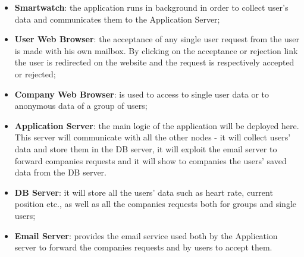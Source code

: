 \documentclass{article}
\begin{document}
\begin{itemize}
\item \textbf{Smartwatch}: the application runs in background in order to collect user's data and communicates them to the Application Server;
\item \textbf{User Web Browser}: the acceptance of any single user request from the user is made with his own mailbox. By clicking on the acceptance or rejection link the user is redirected on the website and the request is respectively accepted or rejected;
\item \textbf{Company Web Browser}: is used to access to single user data or to anonymous data of a group of users;
\item \textbf{Application Server}: the main logic of the application will be deployed here. This server will communicate with all the other nodes - it will collect users' data and store them in the DB server, it will exploit the email server to forward companies requests and it will show to companies the users' saved data from the DB server.
\item \textbf{DB Server}: it will store all the users' data such as heart rate, current position etc., as well as all the companies requests both for groups and single users;
\item \textbf{Email Server}: provides the email service used both by the Application server to forward the companies requests and by users to accept them.
\end{itemize}
\end{document}

